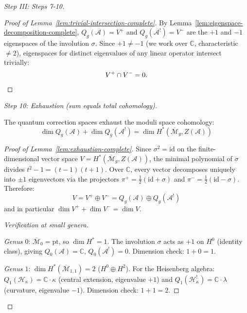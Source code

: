 \begin{proof}[Step III: Steps 7-10]
\begin{proof}[Proof of Lemma~\ref{lem:trivial-intersection-complete}]
By Lemma~\ref{lem:eigenspace-decomposition-complete}, $Q_g(\mathcal{A}) = V^+$ and
$Q_g(\mathcal{A}^!) = V^-$ are the $+1$ and $-1$ eigenspaces of the involution
$\sigma$.  Since $+1 \neq -1$ (we work over $\mathbb{C}$, characteristic $\neq 2$),
eigenspaces for distinct eigenvalues of any linear operator intersect trivially:
\[
V^+ \cap V^- = 0. \qedhere
\]
\end{proof}

\emph{Step 10: Exhaustion (sum equals total cohomology).}

\begin{lemma}
\label{lem:exhaustion-complete}
The quantum correction spaces exhaust the moduli space cohomology:
\begin{equation}
\dim Q_g(\mathcal{A}) + \dim Q_g(\mathcal{A}^!) = \dim H^*(\overline{\mathcal{M}}_g,
Z(\mathcal{A}))
\end{equation}
\end{lemma}

\begin{proof}[Proof of Lemma~\ref{lem:exhaustion-complete}]
Since $\sigma^2 = \mathrm{id}$ on the finite-dimensional vector space
$V = H^*(\overline{\mathcal{M}}_g, Z(\mathcal{A}))$, the minimal polynomial of
$\sigma$ divides $t^2 - 1 = (t-1)(t+1)$.  Over $\mathbb{C}$, every vector decomposes
uniquely into $\pm 1$ eigenvectors via the projectors
$\pi^+ = \frac{1}{2}(\mathrm{id} + \sigma)$ and
$\pi^- = \frac{1}{2}(\mathrm{id} - \sigma)$.  Therefore:
\begin{equation}
V = V^+ \oplus V^- = Q_g(\mathcal{A}) \oplus Q_g(\mathcal{A}^!)
\end{equation}
and in particular $\dim V^+ + \dim V^- = \dim V$.

\emph{Verification at small genera.}

\emph{Genus $0$}: $\overline{\mathcal{M}}_0 = \mathrm{pt}$, so
$\dim H^* = 1$.  The involution $\sigma$ acts as $+1$ on $H^0$ (identity class),
giving $Q_0(\mathcal{A}) = \mathbb{C}$, $Q_0(\mathcal{A}^!) = 0$.  Dimension check:
$1 + 0 = 1$.

\emph{Genus $1$}: $\dim H^*(\overline{\mathcal{M}}_{1,1}) = 2$ ($H^0 \oplus H^2$).
For the Heisenberg algebra: $Q_1(\mathcal{H}_\kappa) = \mathbb{C} \cdot \kappa$
(central extension, eigenvalue $+1$) and $Q_1(\mathcal{H}_\kappa^!) = \mathbb{C}
\cdot \lambda$ (curvature, eigenvalue $-1$).  Dimension check: $1 + 1 = 2$.


\end{proof}
\end{proof}
